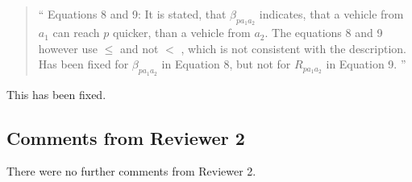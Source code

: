 \documentclass{article}
\begin{document}
\begin{itemize}
    \begin{quote}
        ``      Equations 8 and 9: It is stated, that \(\beta_{pa_1a_2}\) indicates, that a vehicle from
        \(a_1\) can reach \(p\) quicker, than a vehicle from \(a_2\). The equations 8 and 9
        however use \(\leq\) and not \(<\) , which is not consistent with the description.
Has been fixed for \(\beta_{pa_1a_2}\) in Equation 8, but not for \(R_{pa_1a_2}\) in Equation
9. ''
    \end{quote}
    This has been fixed.

\end{itemize}

\subsection{Comments from Reviewer 2}

There were no further comments from Reviewer 2.
\end{document}
